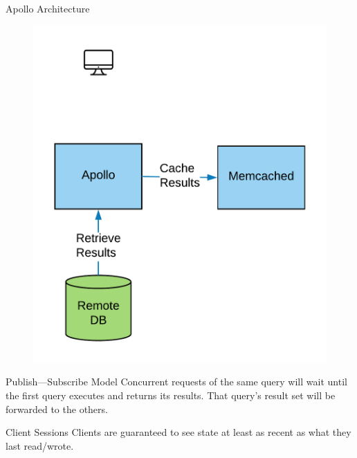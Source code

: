 \documentclass[10pt]{beamer}
\begin{document}
\begin{frame}[fragile]{Apollo Architecture}
    \begin{figure}
        \includegraphics[scale=0.17]{apollo_arch_diagram_8}
    \end{figure}
\end{frame}

\begin{frame}[fragile]{Publish---Subscribe Model}
Concurrent requests of the same query will wait until the first query executes and returns its results.
That query's result set will be \alert{forwarded} to the others.
\end{frame}

\begin{frame}[fragile]{Client Sessions}
Clients are guaranteed to see state at least as recent as what they last read/wrote.
    \begin{itemize}
    \end{itemize}
\end{frame}
\end{document}
